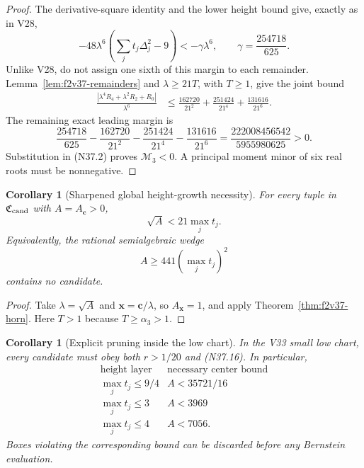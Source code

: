 \documentclass[11pt]{article}
\newtheorem{corollary}[theorem]{Corollary}
\theoremstyle{definition}
\theoremstyle{remark}
\begin{document}
\begin{proof}
The derivative-square identity and the lower height bound give, exactly as
in V28,
\[
 -48\lambda^6
 \left(\sum_jt_j\Delta_j^2-9\right)
 <-\gamma\lambda^6,
 \qquad \gamma=\frac{254718}{625}.
\tag{N37.13}
\]
Unlike V28, do not assign one sixth of this margin to each remainder.
Lemma~\ref{lem:f2v37-remainders} and \(\lambda\geq21T\), with
\(T\geq1\), give the joint bound
\[
\begin{aligned}
 \frac{|\lambda^4R_4+\lambda^2R_2+R_0|}{\lambda^6}
 &\leq
 \frac{162720}{21^2}
 +\frac{251424}{21^4}
 +\frac{131616}{21^6}.
\end{aligned}
\tag{N37.14}
\]
The remaining exact leading margin is
\[
 \frac{254718}{625}
 -\frac{162720}{21^2}
 -\frac{251424}{21^4}
 -\frac{131616}{21^6}
 =\frac{222008456542}{5955980625}>0.
\tag{N37.15}
\]
Substitution in \textup{(N37.2)} proves \(\mathcal M_3<0\).  A principal
moment minor of six real roots must be nonnegative.
\end{proof}

\begin{corollary}[Sharpened global height-growth necessity]
\label{cor:f2v37-growth}
For every tuple in \(\mathfrak C_{\rm cand}\) with
\(A=A_{\bm c}>0\),
\[
 \boxed{\sqrt A<21\max_jt_j.}
\tag{N37.16}
\]
Equivalently, the rational semialgebraic wedge
\[
 A\geq441\left(\max_jt_j\right)^2
\tag{N37.17}
\]
contains no candidate.
\end{corollary}

\begin{proof}
Take \(\lambda=\sqrt A\) and
\(\bm x=\bm c/\lambda\), so \(A_{\bm x}=1\), and apply
Theorem~\ref{thm:f2v37-horn}.  Here \(T>1\) because
\(T\geq\alpha_3>1\).
\end{proof}

\begin{corollary}[Explicit pruning inside the low chart]
\label{cor:f2v37-low-pruning}
In the V33 small low chart, every candidate must obey both
\(r>1/20\) and \textup{(N37.16)}.  In particular,
\[
\begin{array}{c|c}
\text{height layer}&\text{necessary center bound}\\ \hline
\max_jt_j\leq9/4&A<35721/16\\
\max_jt_j\leq3&A<3969\\
\max_jt_j\leq4&A<7056.
\end{array}
\tag{N37.18}
\]
Boxes violating the corresponding bound can be discarded before any
Bernstein evaluation.
\end{corollary}
\end{document}
